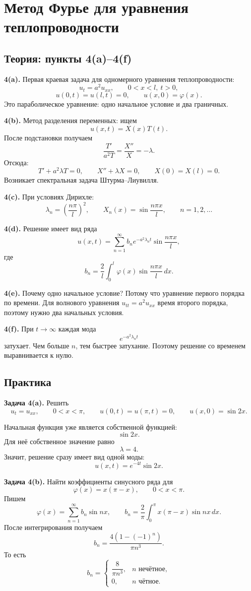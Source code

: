 \documentclass[a4paper,12pt]{article}
\begin{document}
\section{Метод Фурье для уравнения теплопроводности}

\subsection{Теория: пункты 4(a)--4(f)}

\textbf{4(a).} Первая краевая задача для одномерного уравнения теплопроводности:
\[
u_t=a^2u_{xx},
\qquad 0<x<l,\ t>0,
\]
\[
u(0,t)=u(l,t)=0,
\qquad
u(x,0)=\varphi(x).
\]
Это параболическое уравнение: одно начальное условие и два граничных.

\textbf{4(b).} Метод разделения переменных: ищем
\[
u(x,t)=X(x)T(t).
\]
После подстановки получаем
\[
\frac{T'}{a^2T}=\frac{X''}{X}=-\lambda.
\]
Отсюда:
\[
T'+a^2\lambda T=0,
\qquad
X''+\lambda X=0,
\qquad
X(0)=X(l)=0.
\]
Возникает спектральная задача Штурма--Лиувилля.

\textbf{4(c).} При условиях Дирихле:
\[
\lambda_n=\left(\frac{n\pi}{l}\right)^2,
\qquad
X_n(x)=\sin \frac{n\pi x}{l},
\qquad n=1,2,\dots
\]

\textbf{4(d).} Решение имеет вид ряда
\[
u(x,t)=\sum_{n=1}^\infty b_n e^{-a^2\lambda_n t}\sin\frac{n\pi x}{l},
\]
где
\[
b_n=\frac{2}{l}\int_0^l \varphi(x)\sin\frac{n\pi x}{l}\,dx.
\]

\textbf{4(e).} Почему одно начальное условие? Потому что уравнение первого порядка по времени. Для волнового уравнения $u_{tt}=a^2u_{xx}$ время второго порядка, поэтому нужно два начальных условия.

\textbf{4(f).} При $t\to\infty$ каждая мода
\[
e^{-a^2\lambda_n t}
\]
затухает. Чем больше $n$, тем быстрее затухание. Поэтому решение со временем выравнивается к нулю.

\subsection{Практика}

\textbf{Задача 4(a).} Решить
\[
u_t=u_{xx},
\qquad 0<x<\pi,
\qquad
u(0,t)=u(\pi,t)=0,
\qquad
u(x,0)=\sin 2x.
\]

Начальная функция уже является собственной функцией:
\[
\sin 2x.
\]
Для неё собственное значение равно
\[
\lambda=4.
\]
Значит, решение сразу имеет вид одной моды:
\[
u(x,t)=e^{-4t}\sin 2x.
\]

\textbf{Задача 4(b).} Найти коэффициенты синусного ряда для
\[
\varphi(x)=x(\pi-x),
\qquad 0<x<\pi.
\]
Пишем
\[
\varphi(x)=\sum_{n=1}^\infty b_n\sin nx,
\qquad
b_n=\frac{2}{\pi}\int_0^\pi x(\pi-x)\sin nx\,dx.
\]
После интегрирования получаем
\[
b_n=\frac{4(1-(-1)^n)}{\pi n^3}.
\]
То есть
\[
b_n=
\begin{cases}
\dfrac{8}{\pi n^3}, & n \text{ нечётное},\\[0.4em]
0, & n \text{ чётное}.
\end{cases}
\]
\end{document}
